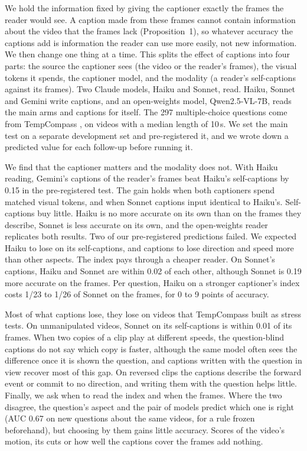 \documentclass[11pt]{article}
\begin{document}
We hold the information fixed by giving the captioner exactly the frames the reader would see. A caption made from these frames cannot contain information about the video that the frames lack (Proposition~1), so whatever accuracy the captions add is information the reader can use more easily, not new information. We then change one thing at a time. This splits the effect of captions into four parts: the source the captioner sees (the video or the reader's frames), the visual tokens it spends, the captioner model, and the modality (a reader's self-captions against its frames). Two Claude models, Haiku and Sonnet, read. Haiku, Sonnet and Gemini write captions, and an open-weights model, Qwen2.5-VL-7B, reads the main arms and captions for itself. The 297 multiple-choice questions come from TempCompass \citep{tempcompass}, on videos with a median length of 10\,s. We set the main test on a separate development set and pre-registered it, and we wrote down a predicted value for each follow-up before running it.

We find that the captioner matters and the modality does not. With Haiku reading, Gemini's captions of the reader's frames beat Haiku's self-captions by 0.15 in the pre-registered test. The gain holds when both captioners spend matched visual tokens, and when Sonnet captions input identical to Haiku's. Self-captions buy little. Haiku is no more accurate on its own than on the frames they describe, Sonnet is less accurate on its own, and the open-weights reader replicates both results. Two of our pre-registered predictions failed. We expected Haiku to lose on its self-captions, and captions to lose direction and speed more than other aspects. The index pays through a cheaper reader. On Sonnet's captions, Haiku and Sonnet are within 0.02 of each other, although Sonnet is 0.19 more accurate on the frames. Per question, Haiku on a stronger captioner's index costs 1/23 to 1/26 of Sonnet on the frames, for 0 to 9 points of accuracy.

Most of what captions lose, they lose on videos that TempCompass built as stress tests. On unmanipulated videos, Sonnet on its self-captions is within 0.01 of its frames. When two copies of a clip play at different speeds, the question-blind captions do not say which copy is faster, although the same model often sees the difference once it is shown the question, and captions written with the question in view recover most of this gap. On reversed clips the captions describe the forward event or commit to no direction, and writing them with the question helps little. Finally, we ask when to read the index and when the frames. Where the two disagree, the question's aspect and the pair of models predict which one is right (AUC 0.67 on new questions about the same videos, for a rule frozen beforehand), but choosing by them gains little accuracy. Scores of the video's motion, its cuts or how well the captions cover the frames add nothing.
\end{document}
